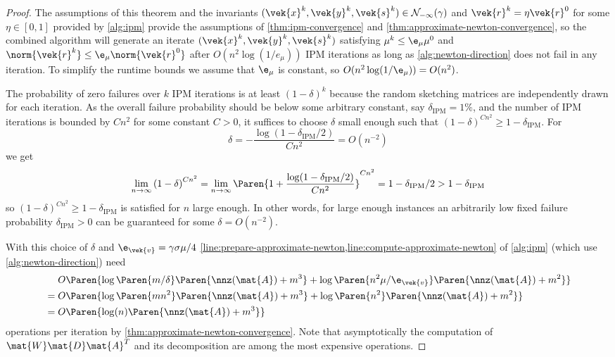 \begin{proof}
  The assumptions of this theorem and the invariants \((\vek{x}^k, \vek{y}^k, \vek{s}^k) \in \mathcal{N}_{-\infty}(\gamma)\) and \(\vek{r}^k = \eta \vek{r}^0\) for some \(\eta \in [0, 1]\) provided by \cref{alg:ipm} provide the assumptions of \cref{thm:ipm-convergence} and \cref{thm:approximate-newton-convergence}, so the combined algorithm will generate an iterate \((\vek{x}^k, \vek{y}^k, \vek{s}^k)\) satisfying \(\mu^k \leq \e_\mu \mu^0\) and \(\norm{\vek{r}^k} \leq \e_\mu \norm{\vek{r}^0}\) after \(O(n^2 \log(1/e_\mu))\) IPM iterations as long as \cref{alg:newton-direction} does not fail in any iteration.
  To simplify the runtime bounds we assume that \(\e_\mu\) is constant, so \(O(n^2 \log(1/\e_\mu)) = O(n^2)\).

  The probability of zero failures over \(k\) IPM iterations is at least \({(1 - \delta)}^k\) because the random sketching matrices are independently drawn for each iteration.
  As the overall failure probability should be below some arbitrary constant, say \(\delta_{\mathrm{IPM}} = 1\%\), and the number of IPM iterations is bounded by \(C n^2\) for some constant \(C > 0\), it suffices to choose \(\delta\) small enough such that
  \( {(1 - \delta)}^{C n^2} \geq 1 - \delta_{\mathrm{IPM}} \).
  For 
  \[ \delta = -\frac{\log(1 - \delta_{\mathrm{IPM}} / 2)}{Cn^2} = O(n^{-2})\]
  we get
  \[ \lim_{n \to \infty} {(1 - \delta)}^{C n^2} = \lim_{n \to \infty} \Paren{1 + \frac{\log(1 - \delta_{\mathrm{IPM}} / 2)}{Cn^2}}^{C n^2} = 1 - \delta_{\mathrm{IPM}} / 2 > 1 - \delta_{\mathrm{IPM}} \]
  so \( {(1 - \delta)}^{C n^2} \geq 1 - \delta_{\mathrm{IPM}} \) is satisfied for \(n\) large enough.
  In other words, for large enough instances an arbitrarily low fixed failure probability \(\delta_{\mathrm{IPM}} > 0\) can be guaranteed for some \(\delta = O(n^{-2})\).

  With this choice of \(\delta\) and \(\e_{\vek{v}} = \gamma \sigma \mu / 4\) \cref{line:prepare-approximate-newton,line:compute-approximate-newton} of \cref{alg:ipm} (which use \cref{alg:newton-direction}) need
  \begin{align*}
    &\phantom{{}={}} O \Paren{\log \Paren{m/\delta} \Paren{\nnz(\mat{A}) + m^3} + \log \Paren{n^2 \mu / \e_{\vek{v}}} \Paren{\nnz(\mat{A}) + m^2}} \\
    &= O \Paren{\log \Paren{mn^2} \Paren{\nnz(\mat{A}) + m^3} + \log \Paren{n^2} \Paren{\nnz(\mat{A}) + m^2}} \\
    &= O \Paren{\log(n) \Paren{\nnz(\mat{A}) + m^3}}
  \end{align*}
  operations per iteration by \cref{thm:approximate-newton-convergence}.
  Note that asymptotically the computation of \(\mat{W}\mat{D}\mat{A}^T\) and its decomposition are among the most expensive operations.


\end{proof}
